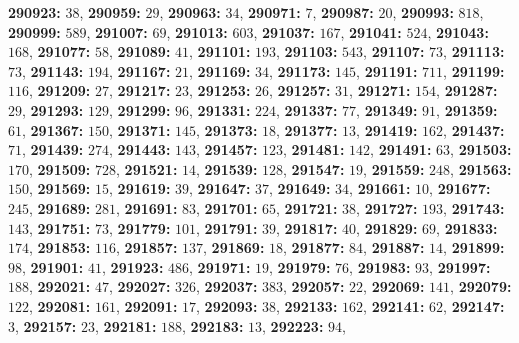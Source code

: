 \textsf{\bfseries 290923:} $38$, \textsf{\bfseries 290959:} $29$, \textsf{\bfseries 290963:} $34$, \textsf{\bfseries 290971:} $7$, \textsf{\bfseries 290987:} $20$, \textsf{\bfseries 290993:} $818$, \textsf{\bfseries 290999:} $589$, \textsf{\bfseries 291007:} $69$, \textsf{\bfseries 291013:} $603$, \textsf{\bfseries 291037:} $167$, \textsf{\bfseries 291041:} $524$, \textsf{\bfseries 291043:} $168$, \textsf{\bfseries 291077:} $58$, \textsf{\bfseries 291089:} $41$, \textsf{\bfseries 291101:} $193$, \textsf{\bfseries 291103:} $543$, \textsf{\bfseries 291107:} $73$, \textsf{\bfseries 291113:} $73$, \textsf{\bfseries 291143:} $194$, \textsf{\bfseries 291167:} $21$, \textsf{\bfseries 291169:} $34$, \textsf{\bfseries 291173:} $145$, \textsf{\bfseries 291191:} $711$, \textsf{\bfseries 291199:} $116$, \textsf{\bfseries 291209:} $27$, \textsf{\bfseries 291217:} $23$, \textsf{\bfseries 291253:} $26$, \textsf{\bfseries 291257:} $31$, \textsf{\bfseries 291271:} $154$, \textsf{\bfseries 291287:} $29$, \textsf{\bfseries 291293:} $129$, \textsf{\bfseries 291299:} $96$, \textsf{\bfseries 291331:} $224$, \textsf{\bfseries 291337:} $77$, \textsf{\bfseries 291349:} $91$, \textsf{\bfseries 291359:} $61$, \textsf{\bfseries 291367:} $150$, \textsf{\bfseries 291371:} $145$, \textsf{\bfseries 291373:} $18$, \textsf{\bfseries 291377:} $13$, \textsf{\bfseries 291419:} $162$, \textsf{\bfseries 291437:} $71$, \textsf{\bfseries 291439:} $274$, \textsf{\bfseries 291443:} $143$, \textsf{\bfseries 291457:} $123$, \textsf{\bfseries 291481:} $142$, \textsf{\bfseries 291491:} $63$, \textsf{\bfseries 291503:} $170$, \textsf{\bfseries 291509:} $728$, \textsf{\bfseries 291521:} $14$, \textsf{\bfseries 291539:} $128$, \textsf{\bfseries 291547:} $19$, \textsf{\bfseries 291559:} $248$, \textsf{\bfseries 291563:} $150$, \textsf{\bfseries 291569:} $15$, \textsf{\bfseries 291619:} $39$, \textsf{\bfseries 291647:} $37$, \textsf{\bfseries 291649:} $34$, \textsf{\bfseries 291661:} $10$, \textsf{\bfseries 291677:} $245$, \textsf{\bfseries 291689:} $281$, \textsf{\bfseries 291691:} $83$, \textsf{\bfseries 291701:} $65$, \textsf{\bfseries 291721:} $38$, \textsf{\bfseries 291727:} $193$, \textsf{\bfseries 291743:} $143$, \textsf{\bfseries 291751:} $73$, \textsf{\bfseries 291779:} $101$, \textsf{\bfseries 291791:} $39$, \textsf{\bfseries 291817:} $40$, \textsf{\bfseries 291829:} $69$, \textsf{\bfseries 291833:} $174$, \textsf{\bfseries 291853:} $116$, \textsf{\bfseries 291857:} $137$, \textsf{\bfseries 291869:} $18$, \textsf{\bfseries 291877:} $84$, \textsf{\bfseries 291887:} $14$, \textsf{\bfseries 291899:} $98$, \textsf{\bfseries 291901:} $41$, \textsf{\bfseries 291923:} $486$, \textsf{\bfseries 291971:} $19$, \textsf{\bfseries 291979:} $76$, \textsf{\bfseries 291983:} $93$, \textsf{\bfseries 291997:} $188$, \textsf{\bfseries 292021:} $47$, \textsf{\bfseries 292027:} $326$, \textsf{\bfseries 292037:} $383$, \textsf{\bfseries 292057:} $22$, \textsf{\bfseries 292069:} $141$, \textsf{\bfseries 292079:} $122$, \textsf{\bfseries 292081:} $161$, \textsf{\bfseries 292091:} $17$, \textsf{\bfseries 292093:} $38$, \textsf{\bfseries 292133:} $162$, \textsf{\bfseries 292141:} $62$, \textsf{\bfseries 292147:} $3$, \textsf{\bfseries 292157:} $23$, \textsf{\bfseries 292181:} $188$, \textsf{\bfseries 292183:} $13$, \textsf{\bfseries 292223:} $94$, 
